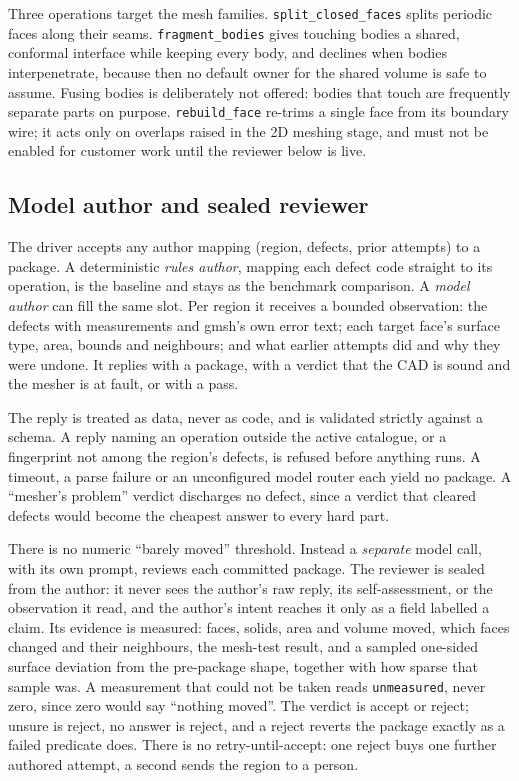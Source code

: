 \documentclass[10pt,onecolumn]{article}
\newcommand{\code}[1]{\texttt{\small #1}}
\begin{document}
Three operations target the mesh families. \code{split\_closed\_faces} splits periodic faces along
their seams. \code{fragment\_bodies} gives touching bodies a shared, conformal interface while
keeping every body, and declines when bodies interpenetrate, because then no default owner for the
shared volume is safe to assume. Fusing bodies is deliberately not offered: bodies that touch are
frequently separate parts on purpose. \code{rebuild\_face} re-trims a single face from its boundary
wire; it acts only on overlaps raised in the 2D meshing stage, and must not be enabled for customer
work until the reviewer below is live.

\subsection{Model author and sealed reviewer}\label{sec:model}

The driver accepts any author mapping (region, defects, prior attempts) to a package. A
deterministic \emph{rules author}, mapping each defect code straight to its operation, is the
baseline and stays as the benchmark comparison. A \emph{model author} can fill the same slot. Per
region it receives a bounded observation: the defects with measurements and gmsh's own error text;
each target face's surface type, area, bounds and neighbours; and what earlier attempts did and why
they were undone. It replies with a package, with a verdict that the CAD is sound and the mesher is
at fault, or with a pass.

The reply is treated as data, never as code, and is validated strictly against a schema. A reply
naming an operation outside the active catalogue, or a fingerprint not among the region's defects,
is refused before anything runs. A timeout, a parse failure or an unconfigured model router each
yield no package. A ``mesher's problem'' verdict discharges no defect, since a verdict that cleared
defects would become the cheapest answer to every hard part.

There is no numeric ``barely moved'' threshold. Instead a \emph{separate} model call, with its own
prompt, reviews each committed package. The reviewer is sealed from the author: it never sees the
author's raw reply, its self-assessment, or the observation it read, and the author's intent reaches
it only as a field labelled a claim. Its evidence is measured: faces, solids, area and volume
moved, which faces changed and their neighbours, the mesh-test result, and a sampled one-sided
surface deviation from the pre-package shape, together with how sparse that sample was. A
measurement that could not be taken reads \texttt{unmeasured}, never zero, since zero would say
``nothing moved''. The verdict is accept or reject; unsure is reject, no answer is reject, and a
reject reverts the package exactly as a failed predicate does. There is no retry-until-accept: one
reject buys one further authored attempt, a second sends the region to a person.
\end{document}
